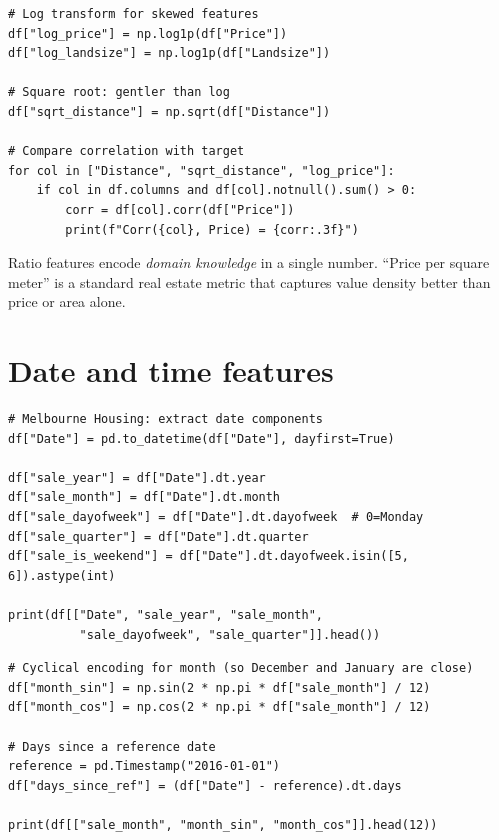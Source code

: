 \begin{verbatim}
# Log transform for skewed features
df["log_price"] = np.log1p(df["Price"])
df["log_landsize"] = np.log1p(df["Landsize"])

# Square root: gentler than log
df["sqrt_distance"] = np.sqrt(df["Distance"])

# Compare correlation with target
for col in ["Distance", "sqrt_distance", "log_price"]:
    if col in df.columns and df[col].notnull().sum() > 0:
        corr = df[col].corr(df["Price"])
        print(f"Corr({col}, Price) = {corr:.3f}")
\end{verbatim}

\begin{preprocesstip}
Ratio features encode \emph{domain knowledge} in a single number. ``Price per square meter'' is a standard real estate metric that captures value density better than price or area alone.
\end{preprocesstip}

\section{Date and time features}

\begin{verbatim}
# Melbourne Housing: extract date components
df["Date"] = pd.to_datetime(df["Date"], dayfirst=True)

df["sale_year"] = df["Date"].dt.year
df["sale_month"] = df["Date"].dt.month
df["sale_dayofweek"] = df["Date"].dt.dayofweek  # 0=Monday
df["sale_quarter"] = df["Date"].dt.quarter
df["sale_is_weekend"] = df["Date"].dt.dayofweek.isin([5, 6]).astype(int)

print(df[["Date", "sale_year", "sale_month",
          "sale_dayofweek", "sale_quarter"]].head())
\end{verbatim}

\begin{verbatim}
# Cyclical encoding for month (so December and January are close)
df["month_sin"] = np.sin(2 * np.pi * df["sale_month"] / 12)
df["month_cos"] = np.cos(2 * np.pi * df["sale_month"] / 12)

# Days since a reference date
reference = pd.Timestamp("2016-01-01")
df["days_since_ref"] = (df["Date"] - reference).dt.days

print(df[["sale_month", "month_sin", "month_cos"]].head(12))
\end{verbatim}

